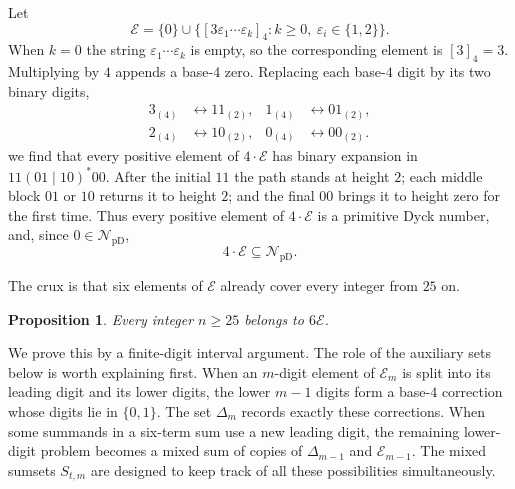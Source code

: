 \documentclass[12pt]{article}
\theoremstyle{plain}
\newtheorem{proposition}[theorem]{Proposition}
\theoremstyle{definition}
\theoremstyle{plain}
\newcommand{\val}[2]{[#1]_{#2}}
\newcommand{\NpD}{\mathcal{N}_{\mathrm{pD}}}
\begin{document}
Let
\[
 \mathcal E=\{0\}\cup
 \bigl\{\val{3\varepsilon_1\cdots\varepsilon_k}{4}:
        k\geq0,\ \varepsilon_i\in\{1,2\}\bigr\}.
\]
When $k=0$ the string $\varepsilon_1\cdots\varepsilon_k$ is empty, so
the corresponding element is $\val{3}{4}=3$.  Multiplying by $4$ appends
a base-$4$ zero.  Replacing each base-$4$ digit by its two binary digits,
\[
\begin{aligned}
 3_{(4)}&\longleftrightarrow11_{(2)},&
 1_{(4)}&\longleftrightarrow01_{(2)},\\
 2_{(4)}&\longleftrightarrow10_{(2)},&
 0_{(4)}&\longleftrightarrow00_{(2)}.
\end{aligned}
\]
we find that every positive element of $4\cdot\mathcal E$ has binary
expansion in $11(01\mid10)^*00$.  After the initial $11$ the path stands
at height $2$; each middle block $01$ or $10$ returns it to height $2$;
and the final $00$ brings it to height zero for the first time.  Thus
every positive element of $4\cdot\mathcal E$ is a primitive Dyck number,
and, since $0\in\NpD$,
\begin{equation}\label{eq:4E}
        4\cdot\mathcal E\subseteq\NpD.
\end{equation}

The crux is that six elements of $\mathcal E$ already cover every integer
from $25$ on.

\begin{proposition}\label{prop:E}
Every integer $n\geq25$ belongs to $6\mathcal E$.
\end{proposition}

We prove this by a finite-digit interval argument.  The role of the
auxiliary sets below is worth explaining first.  When an $m$-digit element
of $\mathcal E_{m}$ is split into its leading digit and its lower digits, the
lower $m-1$ digits form a base-$4$ correction whose digits lie in
$\{0,1\}$.  The set $\Delta_m$ records exactly these corrections.  When
some summands in a six-term sum use a new leading digit, the remaining
lower-digit problem becomes a mixed sum of copies of $\Delta_{m-1}$ and
$\mathcal E_{m-1}$.  The mixed sumsets $S_{t,m}$ are designed to keep
track of all these possibilities simultaneously.
\end{document}
